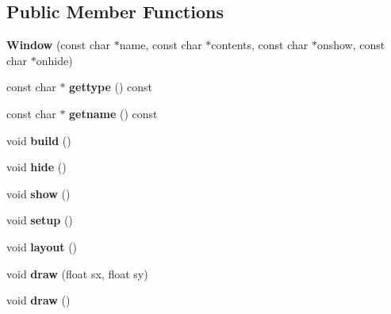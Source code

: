 \subsection*{Public Member Functions}
\begin{DoxyCompactItemize}
\item 
\mbox{\label{struct_u_i_1_1_window_a07b653c36a12cd10b13db6b145116cd3}} 
{\bfseries Window} (const char $\ast$name, const char $\ast$contents, const char $\ast$onshow, const char $\ast$onhide)
\item 
\mbox{\label{struct_u_i_1_1_window_aeb25cf1804c91799ded02152be328323}} 
const char $\ast$ {\bfseries gettype} () const
\item 
\mbox{\label{struct_u_i_1_1_window_ac7fdad4d9918358074831a0d84c9b0e5}} 
const char $\ast$ {\bfseries getname} () const
\item 
\mbox{\label{struct_u_i_1_1_window_a3ceb89f1e3621bfdf8057658dcebc061}} 
void {\bfseries build} ()
\item 
\mbox{\label{struct_u_i_1_1_window_a078d3091cb6f1fc596b71365ebd10333}} 
void {\bfseries hide} ()
\item 
\mbox{\label{struct_u_i_1_1_window_aa387b1d9e14904c4b66a1e57c85d3d7f}} 
void {\bfseries show} ()
\item 
\mbox{\label{struct_u_i_1_1_window_a411fdb2e1c7d94d0f91c840cfdbc265b}} 
void {\bfseries setup} ()
\item 
\mbox{\label{struct_u_i_1_1_window_addd29d34bd314ee5924e075e130353b6}} 
void {\bfseries layout} ()
\item 
\mbox{\label{struct_u_i_1_1_window_a3a710bada0317480f3991a10b2a9e56e}} 
void {\bfseries draw} (float sx, float sy)
\item 
\mbox{\label{struct_u_i_1_1_window_a9a5ee462e6fd4407f3a72ef5e7b6e547}} 
void {\bfseries draw} ()
\item 

\end{DoxyCompactItemize}
